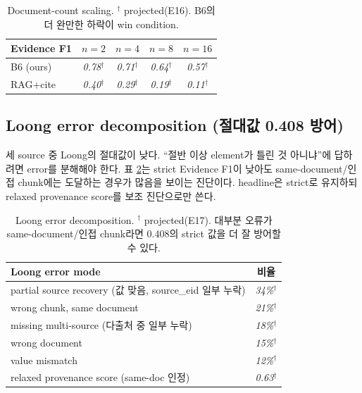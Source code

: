 \documentclass[11pt]{article}
\newcommand{\proj}[1]{\textit{#1}$^\dagger$}
\begin{document}
\begin{table}[h]
\centering\small
\begin{tabular}{lcccc}
\toprule
Evidence F1 & $n{=}2$ & $n{=}4$ & $n{=}8$ & $n{=}16$ \\
\midrule
B6 (ours) & \proj{0.78} & \proj{0.71} & \proj{0.64} & \proj{0.57} \\
RAG+cite & \proj{0.40} & \proj{0.29} & \proj{0.19} & \proj{0.11} \\
\bottomrule
\end{tabular}
\caption{Document-count scaling. $^\dagger$ projected(E16). B6의 더 완만한 하락이 win condition.}
\label{tab:scaling}
\end{table}

\subsection{Loong error decomposition (절대값 0.408 방어)}
세 source 중 Loong의 절대값이 낮다. ``절반 이상 element가 틀린 것 아니냐''에 답하려면 error를
분해해야 한다. 표 \ref{tab:loongerr}는 strict Evidence F1이 낮아도 same-document/인접 chunk에는
도달하는 경우가 많음을 보이는 진단이다. headline은 strict로 유지하되 relaxed provenance score를
보조 진단으로만 쓴다.

\begin{table}[h]
\centering\small
\begin{tabular}{lc}
\toprule
Loong error mode & 비율 \\
\midrule
partial source recovery (값 맞음, source\_eid 일부 누락) & \proj{34\%} \\
wrong chunk, same document & \proj{21\%} \\
missing multi-source (다출처 중 일부 누락) & \proj{18\%} \\
wrong document & \proj{15\%} \\
value mismatch & \proj{12\%} \\
\midrule
relaxed provenance score (same-doc 인정) & \proj{0.63} \\
\bottomrule
\end{tabular}
\caption{Loong error decomposition. $^\dagger$ projected(E17). 대부분 오류가 same-document/인접
chunk라면 0.408의 strict 값을 더 잘 방어할 수 있다.}
\label{tab:loongerr}
\end{table}
\end{document}
